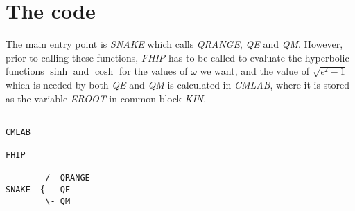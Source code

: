 \section{The code}

The main entry point is {\em SNAKE} which calls {\em QRANGE}, {\em QE} and
{\em QM}. However, prior to calling these functions, {\em FHIP} has to be
called to evaluate the hyperbolic functions $\sinh$ and $\cosh$ for the
values of $\omega$ we want, and the value of $\sqrt{\epsilon^2 - 1}$ which
is needed by both {\em QE} and {\em QM} is calculated in {\em CMLAB}, where
it is stored as the variable {\em EROOT} in common block {\em KIN}.


\begin{verbatim}

CMLAB

FHIP

        /- QRANGE
SNAKE  {-- QE
        \- QM
\end{verbatim}
